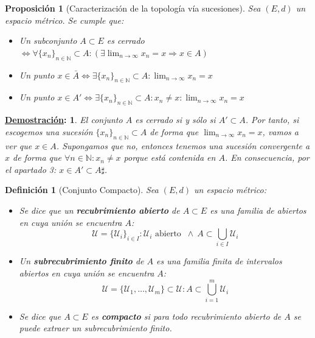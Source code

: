 \documentclass[10pt,a4paper,openright]{book}
\theoremstyle{break}
\newtheorem*{defi}{Definición}
\newtheorem*{prop}{Proposición}
\newtheorem*{demo}{\underline{Demostración}:}
\begin{document}
\begin{prop}[Caracterización de la topología vía sucesiones]
Sea $(E,d)$ un espacio métrico. Se cumple que:
\begin{itemize}
\item Un subconjunto $A \subset E$ es cerrado $\Leftrightarrow \forall \{x_n\}_{n\in \mathbb{N}} \subset A : \left(\exists \lim_{n \rightarrow \infty} x_n = x \Rightarrow x \in A\right)$

\item Un punto $x \in \bar{A} \Leftrightarrow \exists \{x_n\}_{n\in \mathbb{N}} \subset A : \lim_{n \rightarrow \infty} x_n = x$

\item Un punto $x \in A' \Leftrightarrow \exists \{x_n\}_{n\in \mathbb{N}} \subset A : x_n \neq x: \lim_{n \rightarrow \infty} x_n = x$
\end{itemize}
\end{prop}

\begin{demo}
El conjunto $A$ es cerrado si y sólo si $A' \subset A$. Por tanto, si escogemos una sucesión $\{x_n\}_{n\in \mathbb{N}} \subset A$ de forma que $\lim_{n \rightarrow \infty} x_n = x$, vamos a ver que $x\in A$. Supongamos que no, entonces tenemos una sucesión convergente a $x$ de forma que $\forall n \in \mathbb N: x_n \neq x$ porque está contenida en $A$. En consecuencia, por el apartado 3: $x \in A' \subset A \sharp$.
\end{demo}



\begin{defi}[Conjunto Compacto]
Sea $(E,d)$ un espacio métrico:
\begin{itemize}
\item Se dice que un \textbf{recubrimiento abierto} de $A \subset E$ es una familia de abiertos en cuya unión se encuentra $A$:
$$\mathcal{U} = \{ \mathcal{U}_i\}_{i \in I} : \mathcal{U}_i \mbox{ abierto } \ \wedge \ A \subset \bigcup_{i \in I} \mathcal{U}_i$$

\item Un \textbf{subrecubrimiento finito} de $A$ es una familia finita de intervalos abiertos en cuya unión se encuentra $A$:
$$\mathcal{U} = \{ \mathcal{U}_1, \ldots, \mathcal{U}_m\} \subset \mathcal{U}: A \subset \bigcup_{i =1}^{m} \mathcal{U}_i$$

\item Se dice que $A \subset E$ es \textbf{compacto} si para todo recubrimiento abierto de $A$ se puede extraer un subrecubrimiento finito.\end{itemize}
\end{defi}
\end{document}
